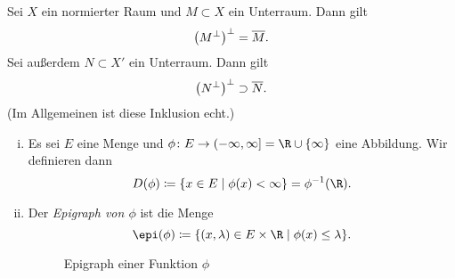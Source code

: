 \begin{thSatz}
    Sei $X$ ein normierter Raum und $M\subset X$ ein Unterraum. Dann gilt
    \[ \bigl(M^\perp\bigr)^\perp = \overline{M}  . \] 
    Sei außerdem $N\subset X'$ ein Unterraum.  Dann gilt 
    \[ \bigl(N^\perp\bigr)^\perp \supset \overline{N}  . \]
    (Im Allgemeinen ist diese Inklusion echt.)
\end{thSatz}

\pagebreak[2]
\begin{thDef}\hfill
    \begin{enumerate}[i)]
        \item
            Es sei $E$ eine Menge und $\phi\colon E\to \neginfinfoc
            = \R \cup \{\infty\}$ eine Abbildung. Wir definieren dann
            \[ D(\phi) \defeq \{ x\in E \Mid \phi(x) < \infty \} 
                = \phi^{-1}(\R)
            . \]
            
        \item
            Der \emph{Epigraph von $\phi$}  ist die Menge
            \[ \epi(\phi) \defeq
                \{ (x,\lambda) \in E\times\R \Mid \phi(x) \leq \lambda \}
            . \]
            \begin{figure}
                \centering
                \caption{Epigraph einer Funktion $\phi$}
                \label{vl07:fig:epigraph}
            \end{figure}
    \end{enumerate}
\end{thDef}


